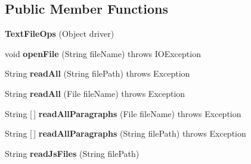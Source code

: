 \subsection*{Public Member Functions}
\begin{DoxyCompactItemize}
\item 
\hypertarget{classcom_1_1zeuslearning_1_1automation_1_1io_1_1TextFileOps_a1a490a8564a3b65755c1cba0a5db1a51}{}\label{classcom_1_1zeuslearning_1_1automation_1_1io_1_1TextFileOps_a1a490a8564a3b65755c1cba0a5db1a51} 
{\bfseries Text\+File\+Ops} (Object driver)
\item 
\hypertarget{classcom_1_1zeuslearning_1_1automation_1_1io_1_1TextFileOps_a7cf05bc89a0d43dc83a29dfbe95e5314}{}\label{classcom_1_1zeuslearning_1_1automation_1_1io_1_1TextFileOps_a7cf05bc89a0d43dc83a29dfbe95e5314} 
void {\bfseries open\+File} (String file\+Name)  throws I\+O\+Exception 
\item 
\hypertarget{classcom_1_1zeuslearning_1_1automation_1_1io_1_1TextFileOps_a782f24e96019d1817caa3f3188e31443}{}\label{classcom_1_1zeuslearning_1_1automation_1_1io_1_1TextFileOps_a782f24e96019d1817caa3f3188e31443} 
String {\bfseries read\+All} (String file\+Path)  throws Exception 
\item 
\hypertarget{classcom_1_1zeuslearning_1_1automation_1_1io_1_1TextFileOps_ac0d4057e324dd766801348923b5c76e0}{}\label{classcom_1_1zeuslearning_1_1automation_1_1io_1_1TextFileOps_ac0d4057e324dd766801348923b5c76e0} 
String {\bfseries read\+All} (File file\+Name)  throws Exception 
\item 
\hypertarget{classcom_1_1zeuslearning_1_1automation_1_1io_1_1TextFileOps_a09e3f2afbe57a8a8e9dfc38e373a13be}{}\label{classcom_1_1zeuslearning_1_1automation_1_1io_1_1TextFileOps_a09e3f2afbe57a8a8e9dfc38e373a13be} 
String \mbox{[}$\,$\mbox{]} {\bfseries read\+All\+Paragraphs} (File file\+Name)  throws Exception 
\item 
\hypertarget{classcom_1_1zeuslearning_1_1automation_1_1io_1_1TextFileOps_ae40c542d81af835f97d9885df4fb8f73}{}\label{classcom_1_1zeuslearning_1_1automation_1_1io_1_1TextFileOps_ae40c542d81af835f97d9885df4fb8f73} 
String \mbox{[}$\,$\mbox{]} {\bfseries read\+All\+Paragraphs} (String file\+Path)  throws Exception 
\item 
\hypertarget{classcom_1_1zeuslearning_1_1automation_1_1io_1_1TextFileOps_aee69297693091fdffc62293349cf1853}{}\label{classcom_1_1zeuslearning_1_1automation_1_1io_1_1TextFileOps_aee69297693091fdffc62293349cf1853} 
String {\bfseries read\+Js\+Files} (String file\+Path)
\item 

\end{DoxyCompactItemize}
